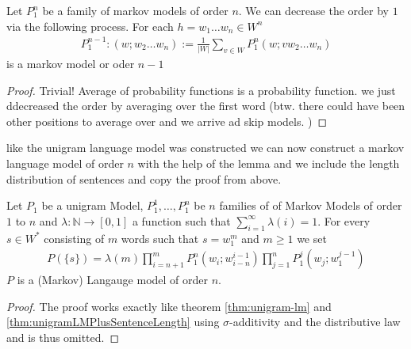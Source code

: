 \documentclass[•]{book}
\begin{document}
\begin{lemma}\label{lem:constructLowerOrderMarkovFamilies}
Let $P_1^n$ be a family of markov models  of order $n$. We can decrease the order by $1$ via the following process. 
For each $h=w_1\dots w_n\in W^n$ 
\begin{align}
P_1^{n-1}:(w;w_2\dots w_n):=\frac{1}{|W|}\sum_{v\in W}P_1^n(w;v w_2\dots w_n)
\end{align}
is a markov model or oder $n-1$ 
\begin{proof}
Trivial!  Average of probability functions is a probability function. we just ddecreased the order by averaging over the first word (btw. there could have been other positions to average over and we arrive ad skip models. )
\end{proof}
\end{lemma}

like the unigram language model was constructed we can now construct a markov language model of order $n$ with the help of the lemma and we include the length distribution of sentences and copy the proof from above. 
\begin{theorem}
Let $P_1$ be a unigram Model, $P_1^1,\dots,P_1^n$ be $n$ families of of Markov Models of order $1$ to $n$ and $\lambda:\mathbb{N}\longrightarrow [0,1]$ a function such that $\sum_{i=1}^\infty\lambda(i) = 1$. For every $s\in W^{*}$ consisting of $m$ words such that $s=w_1^m$  and $m\geq 1$ we set
\begin{align}
P(\{s\})=\lambda(m)\prod_{i=n+1}^mP_1^n(w_i;w_{i-n}^{i-1})\prod_{j=1}^nP_1^{j}(w_j;w_1^{j-1})\label{formula:MarkovLMOrderN}
\end{align}
$P$ is a (Markov) Langauge model of order $n$.
\begin{proof}
The proof works exactly like theorem \ref{thm:unigram-lm} and \ref{thm:unigramLMPlusSentenceLength} using $\sigma$-additivity and the distributive law and is thus omitted. 
\end{proof}
\end{theorem}
\end{document}

